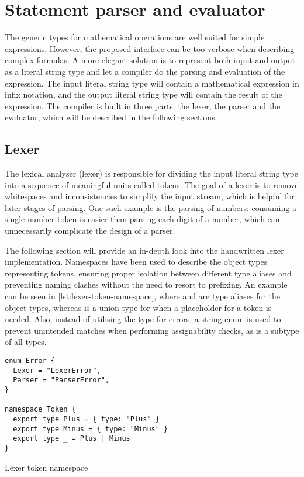 

\section{Statement parser and evaluator}

The generic types for mathematical operations are well suited for simple expressions. However, the proposed interface can be too verbose when describing complex formulas. A more elegant solution is to represent both input and output as a literal string type and let a compiler do the parsing and evaluation of the expression. The input literal string type will contain a mathematical expression in infix notation, and the output literal string type will contain the result of the expression. The compiler is built in three parts: the lexer, the parser and the evaluator, which will be described in the following sections.

\subsection{Lexer}

The lexical analyser (lexer) is responsible for dividing the input literal string type into a sequence of meaningful units called tokens. The goal of a lexer is to remove whitespaces and inconsistencies to simplify the input stream, which is helpful for later stages of parsing. One such example is the parsing of numbers: consuming a single number token is easier than parsing each digit of a number, which can unnecessarily complicate the design of a parser.

The following section will provide an in-depth look into the handwritten lexer implementation. Namespaces have been used to describe the object types representing tokens, ensuring proper isolation between different type aliases and preventing naming clashes without the need to resort to prefixing. An example can be seen in \ref{lst:lexer-token-namespace}, where  and  are type aliases for the object types, whereas \vcode{_} is a union type for when a placeholder for a token is needed. Also, instead of utilising the  type for errors, a string enum is used to prevent unintended matches when performing assignability checks, as  is a subtype of all types.

\begin{listing}[ht]
  \begin{verbatim}
enum Error {
  Lexer = "LexerError",
  Parser = "ParserError",
}

namespace Token {
  export type Plus = { type: "Plus" } 
  export type Minus = { type: "Minus" } 
  export type _ = Plus | Minus
} 
\end{verbatim}
  \caption{Lexer token namespace}\label{lst:lexer-token-namespace}
\end{listing}

